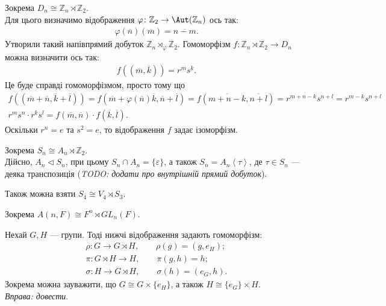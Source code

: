 \documentclass{math_library}
\begin{document}
\begin{example}
Зокрема $D_n \cong \mathbb{Z}_n \rtimes \mathbb{Z}_2$.
\bigskip \\
Для цього визначимо відображення $\varphi \colon \mathbb{Z}_2 \to \Aut(\mathbb{Z}_n)$ ось так:
\begin{align*}
\varphi(\overline{n})(\overline{m}) = \overline{n-m}.
\end{align*}
Утворили такий напівпрямий добуток $\mathbb{Z}_n \rtimes_\varphi \mathbb{Z}_2$. Гомоморфізм $f \colon \mathbb{Z}_n \rtimes \mathbb{Z}_2 \to D_n$ можна визначити ось так:
\begin{align*}
f((\overline{m},\overline{k})) = r^m s^k.
\end{align*}
Це буде справді гомоморфізмом, просто тому що
\begin{align*}
f((\overline{m}+\overline{n},\overline{k}+\overline{l})) = f(\overline{m} + \varphi(\overline{n})\overline{k}, \overline{n} + \overline{l}) = f(\overline{m+n-k}, \overline{n+l}) = r^{m+n-k} s^{n+l} = r^{m-k} s^{n+l} \\
r^m s^n \cdot r^k s^l = f(\overline{m},\overline{n}) \cdot f(\overline{k},\overline{l}).
\end{align*}
Оскільки $r^n = e$ та $s^2 = e$, то відображення $f$ задає ізоморфізм.
\end{example}

\begin{example}
Зокрема $S_n \cong A_n \rtimes \mathbb{Z}_2$.
\bigskip \\
Дійсно, $A_n \triangleleft S_n$, при цьому $S_n \cap A_n = \{\varepsilon\}$, а також $S_n = A_n \left<\tau\right>$, де $\tau \in S_n$ --- деяка транспозиція (\textit{TODO: додати про внутрішній прямий добуток}).
\end{example}

\begin{example}
Також можна взяти $S_4 \cong V_4 \rtimes S_3$.
\end{example}

\begin{example}
Зокрема $A(n,F) \cong F^n \rtimes GL_n(F)$.
\end{example}

\begin{proposition}
Нехай $G,H$ --- групи. Тоді нижчі відображення задають гомоморфізм:
\begin{align*}
\rho \colon G \to G \rtimes H, \qquad \rho(g) = (g,e_H); \\
\pi \colon G \rtimes H \to H, \qquad \pi(g,h) = h; \\
\sigma \colon H \to G \rtimes H, \qquad \sigma(h) = (e_G,h).
\end{align*}
Зокрема можна зауважити, що $G \cong G \times \{e_H\}$, а також $H \cong \{e_G\} \times H$.\\
\textit{Вправа: довести}.
\end{proposition}
\end{document}
